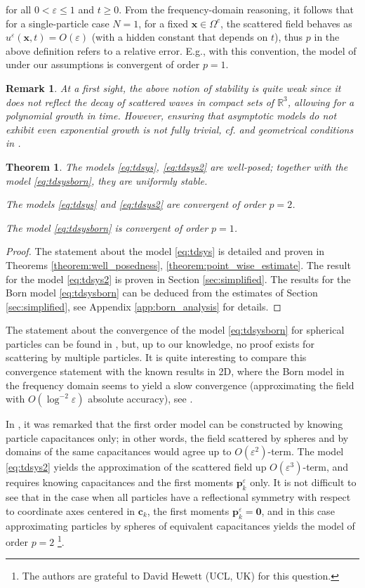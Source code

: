 \documentclass[]{article}
\newtheorem{theorem}{Theorem}
\newtheorem{remark}{Remark}
\numberwithin{equation}{section}
\numberwithin{theorem}{section}
\numberwithin{lemma}{section}
\numberwithin{corollary}{section}
\numberwithin{proposition}{section}
\numberwithin{definition}{section}
\newcommand{\bx}{\boldsymbol{x}}
\newcommand{\re}{\varepsilon}
\renewcommand{\vec}{\boldsymbol}
\begin{document}
	for all $0<\varepsilon\leq 1$ and $t\geq 0$. From the frequency-domain reasoning, it follows that for a single-particle case $N=1$, for a fixed $\vec{x}\in \Omega^c$, the scattered field behaves as $u^{\re}(\bx,t)=O(\re)$ (with a hidden constant that depends on $t$), thus $p$ in the above definition refers to a relative error. E.g., with this convention, the model of \cite{sini_time_domain} under our assumptions is convergent of order $p=1$.  
	\begin{remark}
		At a first sight, the above notion of stability is quite weak since it does not reflect the decay of scattered waves in compact sets of $\mathbb{R}^3$, allowing for a polynomial growth in time. However,  ensuring that asymptotic models do not exhibit even exponential growth is not fully trivial, cf. \cite{MK} and geometrical conditions in \cite{sini_time_domain}. 
	\end{remark}
	\begin{theorem}
		\label{theorem:convergence_of_models}
		The models \eqref{eq:tdsys}, \eqref{eq:tdsys2} are well-posed; together with the model \eqref{eq:tdsysborn}, they  are uniformly stable. 
		
		The models \eqref{eq:tdsys} and \eqref{eq:tdsys2} are convergent of order $p=2$.
		
		The model \eqref{eq:tdsysborn} is convergent of order $p=1$. 
	\end{theorem}
	\begin{proof}
		The statement about the model \eqref{eq:tdsys} is detailed and proven in Theorems \ref{theorem:well_posedness}, \ref{theorem:point_wise_estimate}. The result for the model \eqref{eq:tdsys2} is proven in Section \ref{sec:simplified}. The results for the Born model \eqref{eq:tdsysborn} can be deduced from the estimates of Section \ref{sec:simplified}, see Appendix \ref{app:born_analysis} for details.
	\end{proof}
	The statement about the convergence of the model \eqref{eq:tdsysborn} for spherical particles can be found in \cite{barucq}, but, up to our knowledge, no proof exists for scattering by multiple particles. It is quite interesting to compare this convergence statement with the known results in 2D, where the Born model in the frequency domain seems to yield a slow convergence (approximating the field with $O(\log^{-2}\re)$ absolute accuracy), see \cite{hazard_cassier}. 
	
	In \cite{sini_frequency_domain}, it was remarked that the first order model can be constructed by knowing particle capacitances only; in other words, the field scattered by spheres and by domains of the same capacitances would agree up to $O(\re^2)$-term. The model \eqref{eq:tdsys2} yields the approximation of the scattered field up $O(\re^3)$-term, and requires knowing capacitances and the first moments $\vec{p}_k^{\re}$ only. It is not difficult to see that in the case when all particles have a reflectional symmetry with respect to coordinate axes centered in $\vec{c}_k$, the first moments $\vec{p}_k^{\re}=\vec{0}$, and in this case approximating particles by spheres of equivalent capacitances yields the model of order $p=2$ \footnote{The authors are grateful to David Hewett (UCL, UK) for this question.}. 
	
\end{document}

